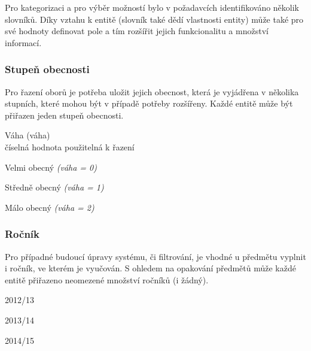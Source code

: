 Pro kategorizaci a pro výběr možností bylo v požadavcích identifikováno několik slovníků. Díky vztahu k entitě (slovník také dědí vlastnosti entity) může také pro své hodnoty definovat pole a tím rozšířit jejich funkcionalitu a množství informací.

\subsubsection*{Stupeň obecnosti}
Pro řazení oborů je potřeba uložit jejich obecnost, která je vyjádřena v několika stupních, které mohou být v případě potřeby rozšířeny. Každé entitě může být přiřazen jeden stupeň obecnosti.\\

\begin{list}{-}{Pole}
  \item Váha (váha) \\
    číselná hodnota použitelná k řazení
\end{list}

\begin{list}{-}{Hodnoty}
  \item Velmi obecný \emph{(váha = 0)} 
  \item Středně obecný \emph{(váha = 1)}
  \item Málo obecný \emph{(váha = 2)}
\end{list}

\subsubsection*{Ročník}
Pro případné budoucí úpravy systému, či filtrování, je vhodné u předmětu vyplnit i ročník, ve kterém je vyučován. S ohledem na opakování předmětů může každé entitě přiřazeno neomezené množství ročníků (i žádný). \\

\begin{list}{-}{Hodnoty}
  \item 2012/13
  \item 2013/14
  \item 2014/15
\end{list}
